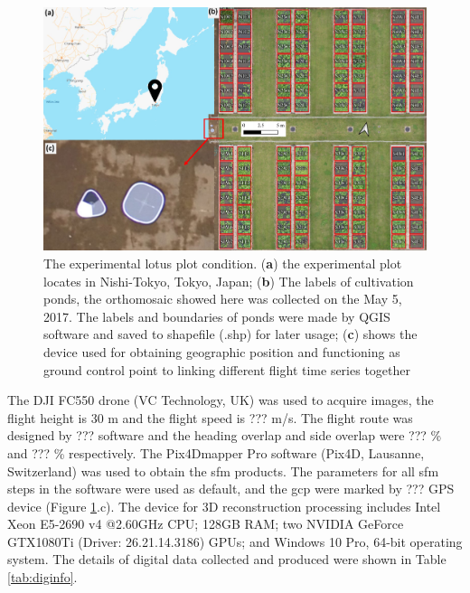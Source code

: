 \documentclass{configs/bmcart}
\begin{document}
\begin{figure}[htpb]
  \centering
  \includegraphics[width=0.95\linewidth]{figures/map.pdf}
  \caption{The experimental lotus plot condition. (\textbf{a}) the experimental plot locates in Nishi-Tokyo, Tokyo, Japan; (\textbf{b}) The labels of cultivation ponds, the orthomosaic showed here was collected on the May 5, 2017. The labels and boundaries of ponds were made by QGIS software and saved to shapefile (\*.shp) for later usage; (\textbf{c}) shows the device used for obtaining geographic position and functioning as ground control point to linking different flight time series together}
  \label{fig:map}
\end{figure}

The DJI FC550 drone (VC Technology, UK) was used to acquire images, the flight height is 30 m and the flight speed is ??? m/s. The flight route was designed by ??? software and the heading overlap and side overlap were ??? \% and ??? \% respectively. The Pix4Dmapper Pro software (Pix4D, Lausanne, Switzerland) was used to obtain the \acrshort*{sfm} products. The parameters for all \acrshort*{sfm} steps in the software were used as default, and the \acrfull*{gcp} were marked by ??? GPS device (Figure \ref{fig:map}.c). The device for 3D reconstruction processing includes Intel Xeon E5-2690 v4 @2.60GHz CPU; 128GB RAM; two NVIDIA GeForce GTX1080Ti (Driver: 26.21.14.3186) GPUs; and Windows 10 Pro, 64-bit operating system. The details of digital data collected and produced were shown in Table \ref{tab:diginfo}.
\end{document}
